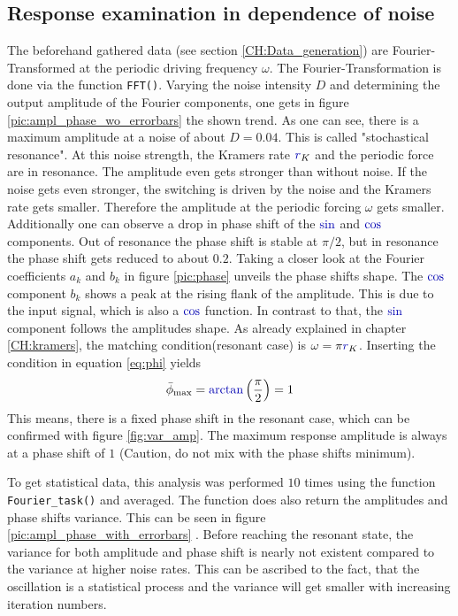 \documentclass[10pt,fleqn,%
reqno,a4paper]{article}
\makeatletter
\def\mathcolor#1#{\@mathcolor{#1}}
\def\@mathcolor#1#2#3{%
        \protect\leavevmode
        \begingroup\color#1{#2}#3\endgroup
}
\newcommand{\nsin}{\mathcolor{blue!70!black}{\sin}}
\newcommand{\ncos}{\mathcolor{blue!70!black}{\cos}}
\newcommand{\narctan}{\mathcolor{blue!70!black}{\arctan}}
\newcommand{\nr}{\mathcolor{blue!70!black}{r}}
\makeatother
\begin{document}
\subsection{Response examination in dependence of noise} \label{sec:CH_response}
The beforehand gathered data (see section \ref{CH:Data_generation}) are Fourier-Transformed at the periodic driving frequency $\omega$. The Fourier-Transformation is done via the function \texttt{FFT()}.%
Varying the noise intensity $D$ and determining the output amplitude of the Fourier components, one gets in figure \ref{pic:ampl_phase_wo_errorbars} the shown trend.
As one can see, there is a maximum amplitude at a noise of about $D = 0.04$. This is called "stochastical resonance". At this noise strength, the Kramers rate $\nr_{K}$ and the periodic force are in resonance. The amplitude even gets stronger than without noise.
If the noise gets even stronger, the switching is driven by the noise and the Kramers rate gets smaller. Therefore the amplitude at the periodic forcing $\omega$ gets smaller.
Additionally one can observe a drop in phase shift of the $\nsin$ and $\ncos$ components.
Out of resonance the phase shift is stable at $\pi/2$, but in resonance the phase shift gets reduced to about $0.2$.
Taking a closer look at the Fourier coefficients $a_k$ and $b_k$ in figure \ref{pic:phase} unveils the phase shifts shape.
The $\ncos$ component $b_k$ shows a peak at the rising flank of the amplitude. This is due to the input signal, which is also a $\ncos$ function. In contrast to that, the $\nsin$ component follows the amplitudes shape.
As already explained in chapter \ref{CH:kramers}, the matching condition(resonant case) is $\omega=\pi \nr_{K}$. Inserting the condition in equation \eqref{eq:phi} yields
\begin{align}
\bar{\phi}_{\mathrm{max}}=\narctan\left(\frac{\pi}{2}\right) = 1
\end{align}
This means, there is a fixed phase shift in the resonant case, which can be confirmed with figure \ref{fig:var_amp}. The maximum response amplitude is always at a phase shift of $1$ (Caution, do not mix with the phase shifts minimum).


To get statistical data, this analysis was performed $10$ times using the function \texttt{Fourier\_task()} and averaged. The function does also return the amplitudes and phase shifts variance. This can be seen in figure \ref{pic:ampl_phase_with_errorbars} .
Before reaching the resonant state, the variance for both amplitude and phase shift is nearly not existent compared to the variance at higher noise rates. This can be ascribed to the fact, that the oscillation is a statistical process and the variance will get smaller with increasing iteration numbers.
\end{document}
